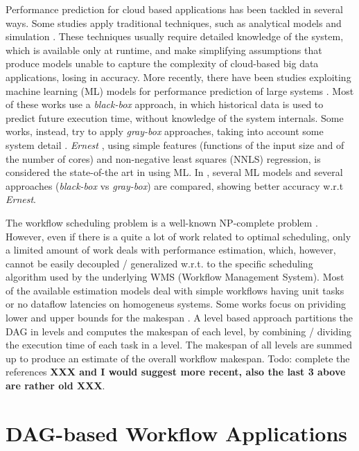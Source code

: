 \documentclass[a4paper, 10pt, conference]{ieeeconf}      %
\begin{document}
Performance prediction for cloud based applications has been tackled in several ways. 
Some studies apply traditional techniques, such as analytical models \cite{nelson1988approximate, mak, ardagna1, liang2000performance} and simulation \cite{bertoli2009jmt}. These techniques usually require detailed knowledge of the system, which is available only at runtime, and make  simplifying assumptions that  produce models unable to capture the complexity of cloud-based big data applications, losing in accuracy. More recently, there have been studies exploiting machine learning (ML) models for performance prediction of large systems \cite{ernest, MUSTAFA20183767, pan2017hemingway, alipourfard2017cherrypick, ARDAGNA2019, lattuada2019gray}.
Most of these works use a \textit{black-box} approach, in which historical data is used to predict future execution time, without knowledge of the system internals. Some works, instead, try to apply \textit{gray-box} approaches, taking into account some system detail \cite{ARDAGNA2019, lattuada2019gray, shon2008scientific}. 
\textit{Ernest} \cite{ernest}, using simple features (functions of the input size and of the number of cores) and non-negative least squares (NNLS) regression, is considered the state-of-the art in using ML. In \cite{ARDAGNA2019}, several ML models and several approaches (\textit{black-box} vs \textit{gray-box}) are compared, showing better accuracy w.r.t \textit{Ernest}.

The workflow scheduling problem is a well-known NP-complete problem \cite{hartmanis1982computers}. However, even if there is a quite a lot of work related  to optimal scheduling, only a limited amount of work deals with performance estimation, which, however,  cannot be easily decoupled / generalized w.r.t. to the specific scheduling algorithm used by the underlying WMS (Workflow Management System).
Most of the available estimation models deal with simple workflows having unit tasks or no dataflow latencies on homogeneus systems. Some works focus on prividing lower and upper bounds for the makespan \cite{al1990lower, jain1994lower, hu1994improved}. A level based approach partitions the DAG in levels and computes the makespan of each level, by combining / dividing the execution time of each task in a level. The makespan of all levels are summed up to produce an estimate of the overall workflow makespan.
Todo: complete the references \textbf{XXX and I would suggest more recent, also the last 3 above are rather old XXX}.


\section{DAG-based Workflow Applications}
\label{section:dag_applications}
\end{document}
